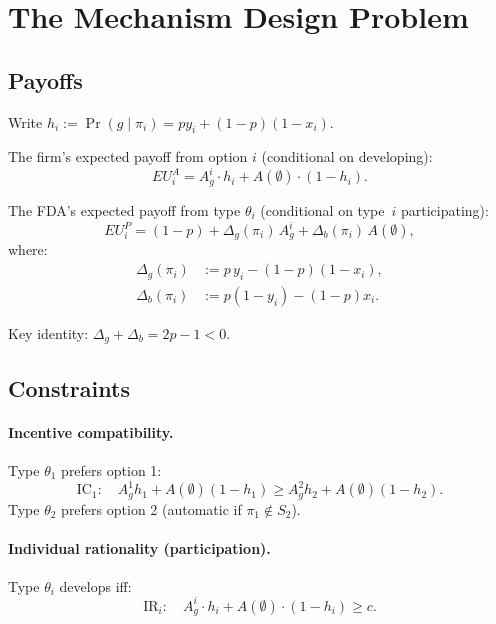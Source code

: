 \documentclass[12pt,a4paper]{article}
\begin{document}
\section{The Mechanism Design Problem}
\label{sec:mechanism}

\subsection{Payoffs}

Write $h_i := \Pr(g \mid \pi_i) = p y_i + (1-p)(1-x_i)$.

The firm's expected payoff from option $i$ (conditional on
developing):
\begin{equation}\label{eq:EU_A}
  EU^A_i = A_g^i \cdot h_i
    + A(\emptyset) \cdot (1 - h_i).
\end{equation}

The FDA's expected payoff from type $\theta_i$
(conditional on type~$i$ participating):
\begin{equation}\label{eq:EU_P_compact}
  EU^P_i = (1-p) + \Delta_g(\pi_i) \, A_g^i
           + \Delta_b(\pi_i) \, A(\emptyset),
\end{equation}
where:
\begin{align}
  \Delta_g(\pi_i)
    &:= p \, y_i - (1-p)(1-x_i),
    \label{eq:delta_g_def} \\
  \Delta_b(\pi_i)
    &:= p(1-y_i) - (1-p) x_i.
    \label{eq:delta_b_def}
\end{align}

Key identity: $\Delta_g + \Delta_b = 2p - 1 < 0$.


\subsection{Constraints}

\paragraph{Incentive compatibility.}
Type $\theta_1$ prefers option 1:
\begin{equation}\label{eq:IC1}
  \text{IC}_1: \quad
  A_g^1 h_1 + A(\emptyset)(1 - h_1)
  \geq
  A_g^2 h_2 + A(\emptyset)(1 - h_2).
\end{equation}
Type $\theta_2$ prefers option 2 (automatic if
$\pi_1 \notin S_2$).

\paragraph{Individual rationality (participation).}
Type $\theta_i$ develops iff:
\begin{equation}\label{eq:IR}
  \text{IR}_i: \quad
  A_g^i \cdot h_i + A(\emptyset) \cdot (1 - h_i) \geq c.
\end{equation}
\end{document}
